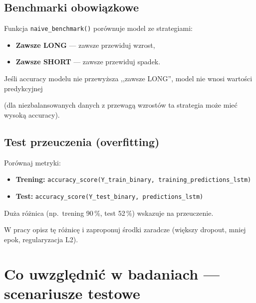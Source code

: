 \documentclass[12pt,a4paper]{report}
\begin{document}
\subsection{Benchmarki obowiązkowe}



Funkcja \texttt{naive\_benchmark()} porównuje model ze strategiami:

\begin{itemize}

    \item \textbf{Zawsze LONG} --- zawsze przewiduj wzrost,

    \item \textbf{Zawsze SHORT} --- zawsze przewiduj spadek.

\end{itemize}

Jeśli accuracy modelu nie przewyższa ,,zawsze LONG'', model nie wnosi wartości predykcyjnej

(dla niezbalansowanych danych z przewagą wzrostów ta strategia może mieć wysoką accuracy).



\subsection{Test przeuczenia (overfitting)}



Porównaj metryki:

\begin{itemize}

    \item \textbf{Trening:} \texttt{accuracy\_score(Y\_train\_binary, training\_predictions\_lstm)}

    \item \textbf{Test:} \texttt{accuracy\_score(Y\_test\_binary, predictions\_lstm)}

\end{itemize}

Duża różnica (np.\ trening 90\,\%, test 52\,\%) wskazuje na przeuczenie.

W pracy opisz tę różnicę i zaproponuj środki zaradcze (większy dropout, mniej epok, regularyzacja L2).



\section{Co uwzględnić w badaniach --- scenariusze testowe}
\end{document}
